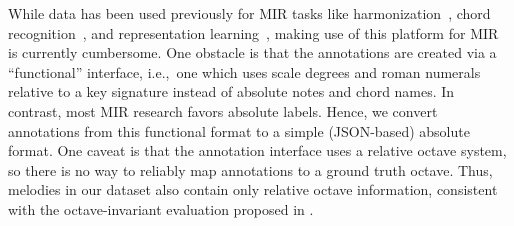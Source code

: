 While \hooktheory{} data has been used previously for MIR tasks like 
harmonization~\cite{chen2021surprisenet,yeh2021automatic}, 
chord recognition~\cite{jiang2019mirex}, and 
representation learning~\cite{jiang2020transformer}, 
making use of this platform for MIR is currently cumbersome. 
One obstacle is that the annotations are created via a ``functional'' interface, i.e.,~one which uses scale degrees and roman numerals relative to a key signature instead of absolute notes and chord names. 
In contrast, most MIR research favors absolute labels.
Hence, we convert annotations from this functional format to a simple (JSON-based) absolute format. 
One caveat is that the \hooktheory{} annotation interface uses a relative octave system, 
so there is no way to reliably map annotations to a ground truth octave.
Thus, melodies in our dataset also contain only relative octave information, consistent with the octave-invariant evaluation proposed in .


%
%

